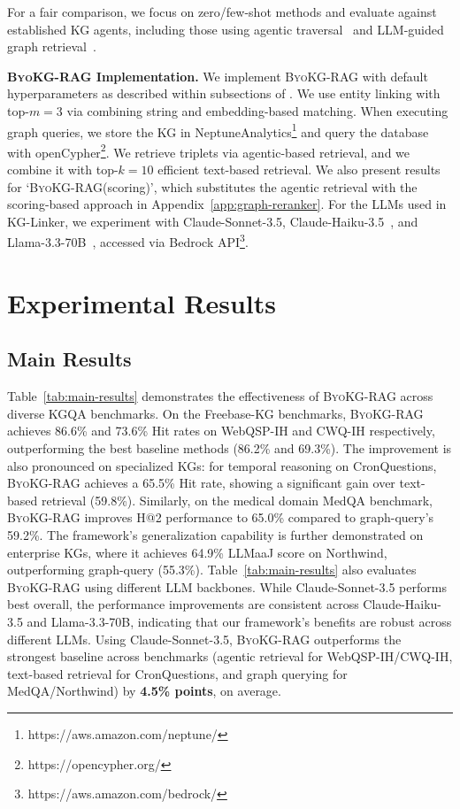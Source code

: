 \documentclass[11pt]{article}
\newcommand{\byokg}{\textsc{ByoKG-RAG}\xspace}
\newcommand{\glink}{KG-Linker\xspace}
\begin{document}
For a fair comparison, we focus on zero/few-shot methods and evaluate against established KG agents, including those using agentic traversal~\citep{jiang2023structgpt,sun2024tog,sui2024fidelis} and LLM-guided graph retrieval~\citep{li2023binder,dong-2025-effiqa}.

\textbf{\byokg Implementation.} We implement \byokg with default hyperparameters as described within subsections of . We use entity linking with top-$m=3$ via combining string and embedding-based matching. When executing graph queries, we store the KG in NeptuneAnalytics\footnote{https://aws.amazon.com/neptune/} and query the database with openCypher\footnote{https://opencypher.org/}. We retrieve triplets via agentic-based retrieval, and we combine it with top-$k=10$ efficient text-based retrieval. We also present results for `\byokg (scoring)', which substitutes the agentic retrieval with the scoring-based approach in Appendix~\ref{app:graph-reranker}. For the LLMs used in \glink, we experiment with Claude-Sonnet-3.5, Claude-Haiku-3.5~\citep{claude}, and Llama-3.3-70B~\citep{grattafiori2024llama}, accessed via Bedrock API\footnote{https://aws.amazon.com/bedrock/}. 



\section{Experimental Results}

\subsection{Main Results}


Table~\ref{tab:main-results} demonstrates the effectiveness of \byokg across diverse KGQA benchmarks. On the Freebase-KG benchmarks, \byokg achieves 86.6\% and 73.6\% Hit rates on WebQSP-IH and CWQ-IH respectively, outperforming the best baseline methods (86.2\% and 69.3\%). The improvement is also pronounced on specialized KGs: for temporal reasoning on CronQuestions, \byokg achieves a 65.5\% Hit rate, showing a significant gain over text-based retrieval (59.8\%). Similarly, on the medical domain MedQA benchmark, \byokg improves H@2 performance to 65.0\% compared to graph-query's 59.2\%. The framework's generalization capability is further demonstrated on enterprise KGs, where it achieves 64.9\% LLMaaJ score on Northwind, outperforming graph-query (55.3\%).
Table~\ref{tab:main-results} also evaluates \byokg  using different LLM backbones. While Claude-Sonnet-3.5 performs best overall, the performance improvements are consistent across Claude-Haiku-3.5 and Llama-3.3-70B, indicating that our framework's benefits are robust across different LLMs. Using Claude-Sonnet-3.5, \byokg outperforms the strongest baseline across benchmarks (agentic retrieval for WebQSP-IH/CWQ-IH, text-based retrieval for CronQuestions, and graph querying for MedQA/Northwind) by \textbf{4.5\% points}, on average.
\end{document}
